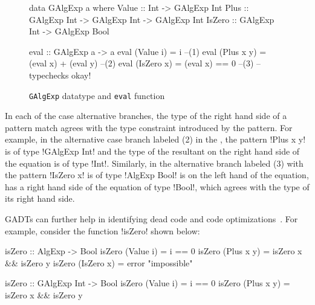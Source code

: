 \documentclass[screen,nonacm,manuscript,review]{acmart} %
\begin{document}
\begin{figure}[ht]
\centering
\begin{minipage}[ht]{0.6\linewidth}
\begin{CenteredBox}
\begin{code}
data GAlgExp a where
  Value  :: Int                        -> GAlgExp Int
  Plus   :: GAlgExp Int -> GAlgExp Int -> GAlgExp Int
  IsZero :: GAlgExp Int                -> GAlgExp Bool
\end{code}
\end{CenteredBox}
\end{minipage}%
\begin{minipage}[ht]{0.4\linewidth}
\begin{CenteredBox}
\begin{code}
eval :: GAlgExp a -> a
eval (Value i) = i                    --(1)
eval (Plus x y) = (eval x) + (eval y) --(2)
eval (IsZero x) = (eval x) == 0       --(3)
                   -- typechecks okay!
\end{code}
\end{CenteredBox}
\end{minipage}%
\caption{\texttt{GAlgExp} datatype and \texttt{eval} function}
\label{fig:galgexp-eval}
\end{figure}

In each of the case alternative branches, the type of the right hand side of a
pattern match agrees with the type constraint introduced by the
pattern. For example, in the alternative case branch labeled (2)
in the , the
pattern !Plus x y! is of type !GAlgExp Int! and the type of the
resultant on the right hand side of the equation is of type !Int!.
Similarly, in the alternative branch labeled (3) with the pattern
!IsZero x! is of type !AlgExp Bool! is on the left hand of the
equation, has a right hand side of the equation
of type !Bool!, which agrees with the type of its right hand side.

GADTs can further help in identifying dead code and code
optimizations~\cite{xi_dead_1998,graf_lower_2020,nilsson_dynamic_2005}.
For example, consider the function !isZero! shown below:

\begin{minipage}[ht]{0.5\linewidth}
\begin{CenteredBox}
\begin{code}
isZero :: AlgExp -> Bool
isZero (Value i) = i == 0
isZero (Plus x y) = isZero x && isZero y
isZero (IsZero x) = error "impossible"
\end{code}
\end{CenteredBox}
\end{minipage}%
\begin{minipage}{0.5\linewidth}
\begin{CenteredBox}
\begin{code}
isZero :: GAlgExp Int -> Bool
isZero (Value i) = i == 0
isZero (Plus x y) = isZero x && isZero y
\end{code}
\end{CenteredBox}
\end{minipage}
\end{document}

